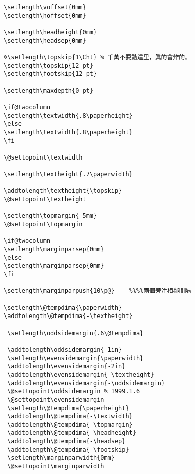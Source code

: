 \begin{lstlisting}[firstnumber=231]
\setlength\voffset{0mm}
\setlength\hoffset{0mm}

\setlength\headheight{0mm}
\setlength\headsep{0mm}

%\setlength\topskip{1\Cht} % 千萬不要動這里，眞的會炸的。
\setlength\topskip{12 pt}
\setlength\footskip{12 pt}

\setlength\maxdepth{0 pt}

\if@twocolumn
\setlength\textwidth{.8\paperheight}
\else
\setlength\textwidth{.8\paperheight}
\fi

\@settopoint\textwidth

\setlength\textheight{.7\paperwidth}

\addtolength\textheight{\topskip}
\@settopoint\textheight

\setlength\topmargin{-5mm}
\@settopoint\topmargin

\if@twocolumn
\setlength\marginparsep{0mm}
\else
\setlength\marginparsep{0mm}
\fi

\setlength\marginparpush{10\p@}    %%%%兩個旁注相鄰間隔

\setlength\@tempdima{\paperwidth}
\addtolength\@tempdima{-\textheight}

 \setlength\oddsidemargin{.6\@tempdima}

 \addtolength\oddsidemargin{-1in}
 \setlength\evensidemargin{\paperwidth}
 \addtolength\evensidemargin{-2in}
 \addtolength\evensidemargin{-\textheight}
 \addtolength\evensidemargin{-\oddsidemargin}
 \@settopoint\oddsidemargin % 1999.1.6
 \@settopoint\evensidemargin
 \setlength\@tempdima{\paperheight}
 \addtolength\@tempdima{-\textwidth}
 \addtolength\@tempdima{-\topmargin}
 \addtolength\@tempdima{-\headheight}
 \addtolength\@tempdima{-\headsep}
 \addtolength\@tempdima{-\footskip}
 \setlength\marginparwidth{0mm}
 \@settopoint\marginparwidth


\end{lstlisting}
